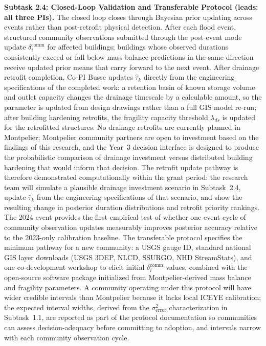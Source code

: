 \documentclass[11pt]{article}
\begin{document}
\textbf{Subtask 2.4: Closed-Loop Validation and Transferable Protocol
(leads: all three PIs).}
The closed loop closes through Bayesian prior updating across events rather than
post-retrofit physical detection.
After each flood event, structured community observations submitted through the
post-event mode update $\delta_i^{\mathrm{comm}}$ for affected buildings;
buildings whose observed durations consistently exceed or fall below mass balance
predictions in the same direction receive updated prior means that carry forward
to the next event.
After drainage retrofit completion, Co-PI Busse updates $\hat{\tau}_k$ directly
from the engineering specifications of the completed work: a retention basin of
known storage volume and outlet capacity changes the drainage timescale by a
calculable amount, so the parameter is updated from design drawings rather than
a full GIS model re-run; after building hardening retrofits, the fragility
capacity threshold $\lambda_{ds}$ is updated for the retrofitted structures.
No drainage retrofits are currently planned in Montpelier; Montpelier community
partners are open to investment based on the findings of this research, and the
Year~3 decision interface is designed to produce the probabilistic comparison of
drainage investment versus distributed building hardening that would inform that
decision.
The retrofit update pathway is therefore demonstrated computationally within the
grant period: the research team will simulate a plausible drainage investment
scenario in Subtask~2.4, update $\hat{\tau}_k$ from the engineering
specifications of that scenario, and show the resulting change in posterior
duration distributions and retrofit priority rankings.
The 2024 event provides the first empirical test of whether one event cycle of
community observation updates measurably improves posterior accuracy relative to
the 2023-only calibration baseline.
The transferable protocol specifies the minimum pathway for a new community:
a USGS gauge ID, standard national GIS layer downloads (USGS 3DEP, NLCD, SSURGO,
NHD StreamStats), and one co-development workshop to elicit initial
$\delta_i^{\mathrm{comm}}$ values, combined with the open-source software package
initialized from Montpelier-derived mass balance and fragility parameters.
A community operating under this protocol will have wider credible intervals than
Montpelier because it lacks local ICEYE calibration; the expected interval widths,
derived from the $\sigma_{\mathrm{error}}^2$ characterization in Subtask~1.1, are
reported as part of the protocol documentation so communities can assess
decision-adequacy before committing to adoption, and intervals narrow with each
community observation cycle.
\end{document}
